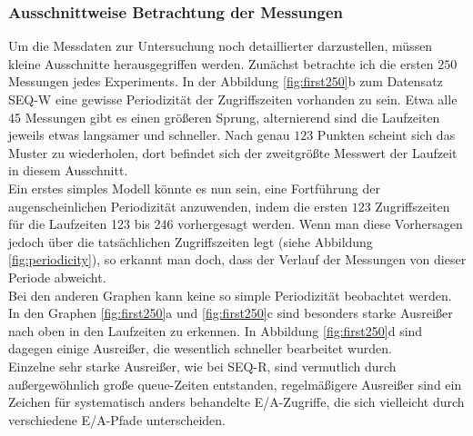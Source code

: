 \documentclass[
	12pt,
	a4paper,
	BCOR10mm,
	DIV14,
	listof=totoc,
	bibliography=totoc,
	headsepline
]{scrreprt}
\begin{document}
\subsubsection{Ausschnittweise Betrachtung der Messungen}
Um die Messdaten zur Untersuchung noch detaillierter darzustellen, müssen kleine Ausschnitte herausgegriffen werden. Zunächst betrachte ich die ersten $250$ Messungen jedes Experiments.
In der Abbildung \ref{fig:first250}b zum Datensatz SEQ-W eine gewisse Periodizität der Zugriffszeiten vorhanden zu sein. Etwa alle 45 Messungen gibt es einen größeren Sprung, alternierend sind die Laufzeiten jeweils etwas langsamer und schneller.
Nach genau $123$ Punkten scheint sich das Muster zu wiederholen, dort befindet sich der zweitgrößte Messwert der Laufzeit in diesem Ausschnitt.\\
Ein erstes simples Modell könnte es nun sein, eine Fortführung der augenscheinlichen Periodizität anzuwenden, indem die ersten $123$ Zugriffszeiten für die Laufzeiten 123 bis 246 vorhergesagt werden.
Wenn man diese Vorhersagen jedoch über die tatsächlichen Zugriffszeiten legt (siehe Abbildung \ref{fig:periodicity}), so erkannt man doch, dass der Verlauf der Messungen von dieser Periode abweicht.\\ 
Bei den anderen Graphen kann keine so simple Periodizität beobachtet werden.
In den Graphen \ref{fig:first250}a und \ref{fig:first250}c sind besonders starke Ausreißer nach oben in den Laufzeiten zu erkennen. In Abbildung \ref{fig:first250}d sind dagegen einige Ausreißer, die wesentlich schneller bearbeitet wurden.\\
Einzelne sehr starke Ausreißer, wie bei SEQ-R, sind vermutlich durch außergewöhnlich große queue-Zeiten entstanden, regelmäßigere Ausreißer sind ein Zeichen für systematisch anders behandelte E/A-Zugriffe, die sich vielleicht durch verschiedene E/A-Pfade unterscheiden.
\end{document}
